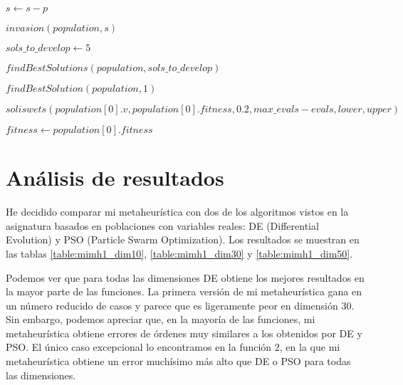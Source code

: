 \documentclass[10pt,a4paper]{article}
\begin{document}
\begin{algorithm}[H]
{{			$s \gets s - p$
			
			$invasion(population, s)$
		}
		
		$sols\_to\_develop \gets 5$
		
		$findBestSolutions(population, sols\_to\_develop)$
		
		
		$findBestSolution(population,1)$
		
		$soliswets(population[0].v, population[0].fitness, 0.2, max\_evals-evals, lower, upper)$
		
		$fitness \gets population[0].fitness$
	}
\end{algorithm}






\section{Análisis de resultados}

He decidido comparar mi metaheurística con dos de los algoritmos vistos en la asignatura basados en poblaciones con variables reales: DE (Differential Evolution) y PSO (Particle Swarm Optimization). Los resultados se muestran en las tablas \ref{table:mimh1_dim10}, \ref{table:mimh1_dim30} y \ref{table:mimh1_dim50}.

Podemos ver que para todas las dimensiones DE obtiene los mejores resultados en la mayor parte de las funciones. La primera versión de mi metaheurística gana en un número reducido de casos y parece que es ligeramente peor en dimensión 30. Sin embargo, podemos apreciar que, en la mayoría de las funciones, mi metaheurística obtiene errores de órdenes muy similares a los obtenidos por DE y PSO. El único caso excepcional lo encontramos en la función 2, en la que mi metaheurística obtiene un error muchísimo más alto que DE o PSO para todas las dimensiones.
\end{document}
